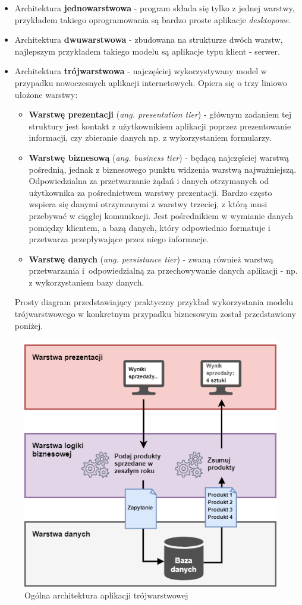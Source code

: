 \begin{itemize}
    \item Architektura \textbf{jednowarstwowa} - program składa się tylko z jednej warstwy, przykładem takiego oprogramowania są bardzo proste aplikacje \textit{desktopowe}.
    \item Architektura \textbf{dwuwarstwowa} - zbudowana na strukturze dwóch warstw, najlepszym przykładem takiego modelu są aplikacje typu klient - serwer.
    \item Architektura \textbf{trójwarstwowa} - najczęściej wykorzystywany model w przypadku nowoczesnych aplikacji internetowych. Opiera się o trzy liniowo ułożone warstwy:
        \begin{itemize}
            \item \textbf{Warstwę prezentacji} (\textit{ang. presentation tier}) - głównym zadaniem tej struktury jest kontakt z użytkownikiem aplikacji poprzez prezentowanie informacji, czy zbieranie danych np. z wykorzystaniem formularzy.
            \item \textbf{Warstwę biznesową} (\textit{ang. business tier}) - będącą najczęściej warstwą pośrednią, jednak z biznesowego punktu widzenia warstwą najważniejszą. Odpowiedzialna za przetwarzanie żądań i danych otrzymanych od użytkownika za pośrednictwem warstwy prezentacji. Bardzo często wspiera się danymi otrzymanymi z warstwy trzeciej, z którą musi przebywać w ciągłej komunikacji. Jest pośrednikiem w wymianie danych pomiędzy klientem, a bazą danych, który odpowiednio formatuje i przetwarza przepływające przez niego informacje.
            \item \textbf{Warstwę danych} (\textit{ang. persistance tier}) - zwaną również warstwą przetwarzania i~odpowiedzialną za przechowywanie danych aplikacji - np. z wykorzystaniem bazy danych.
        \end{itemize}
\noindent Prosty diagram przedstawiający praktyczny przykład wykorzystania modelu trójwarstwowego w konkretnym przypadku biznesowym został przedstawiony poniżej.
\end{itemize}

\begin{figure}[ht]
	\centering
	\includegraphics[width=0.7\linewidth]{graphics/chapter-3/three-tier-architecture.png}
	\caption{Ogólna architektura aplikacji trójwarstwowej}
	\label{three-tier-architecture}
\end{figure}

